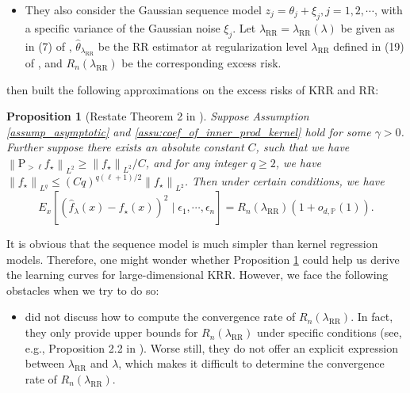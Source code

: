 \documentclass{article}
\theoremstyle{plain}
\newtheorem{proposition}[theorem]{Proposition}
\theoremstyle{definition}
\theoremstyle{remark}
\begin{document}
\begin{appendix}
\begin{itemize}
    \item[(ii)] They also consider the Gaussian sequence model $z_j=\theta_j+ \xi_j, j=1,2, \cdots$, with 
    a specific variance of the Gaussian noise $\xi_j$.
    Let $\lambda_{\text{RR}} = \lambda_{\text{RR}}(\lambda)$ be given as in (7) of \cite{cheng2022dimension},  $\hat{\theta}_{\lambda_{\text{RR}}}$ be the RR estimator at regularization level $\lambda_{\text{RR}}$ defined in (19) of \cite{cheng2022dimension}, and $R_n(\lambda_{\text{RR}})$ be the corresponding excess risk.
    
\end{itemize}

\cite{cheng2022dimension, misiakiewicz2024non} then built the following approximations on the excess risks of KRR and RR:

\begin{proposition}[Restate Theorem 2 in \cite{misiakiewicz2024non}]\label{prop_restate_misia}
    Suppose Assumption \ref{assump_asymptotic} and \ref{assu:coef_of_inner_prod_kernel} hold for some $\gamma>0$. 
    Further suppose there exists an absolute constant $C$, such that we have $\left\|\mathrm{P}_{>\ell} f_{\star}\right\|_{L^2} \geq\left\|f_{\star}\right\|_{L^2} / C$, and for any integer $q \geq 2$,  we have $\left\|f_{\star}\right\|_{L^q} \leq (C q)^{q(\ell+1) / 2}\left\|f_{\star}\right\|_{L^2}$. Then under certain conditions, we have
    $$
    E_{x} \left[ \left(\hat{f}_{\lambda}(x) - f_{\star}(x) \right)^{2} \mid \epsilon_1, \cdots, \epsilon_n \right] = R_n(\lambda_{\text{RR}}) \left(1 + o_{d, \mathbb{P}}\left(1\right)\right).
    $$
\end{proposition}


{\color{red}
It is obvious that the sequence model is much simpler than kernel regression models. Therefore, one might wonder whether Proposition \ref{prop_restate_misia} could help us derive the learning curves for large-dimensional KRR. However, we face the following obstacles when we try to do so:
\begin{itemize}
    \item \cite{cheng2022dimension, misiakiewicz2024non} did not discuss how to compute the convergence rate of $R_n(\lambda_{\text{RR}})$. In fact, they only provide upper bounds for $R_n(\lambda_{\text{RR}})$ under specific conditions (see, e.g., Proposition 2.2 in \cite{cheng2022dimension}). Worse still, they do not offer an explicit expression between $\lambda_{\text{RR}}$ and $\lambda$, which makes it difficult to determine the convergence rate of $R_n(\lambda_{\text{RR}})$.


\end{itemize}}
\end{appendix}
\end{document}
